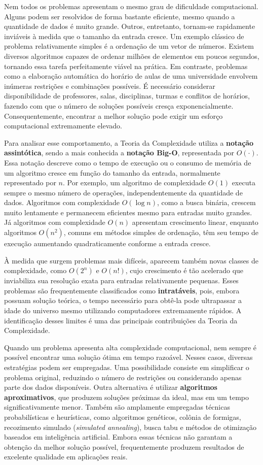 \documentclass[
  brazilian,
  letterpaper,
]{book}
\theoremstyle{plain}
\theoremstyle{definition}
\theoremstyle{remark}
\begin{document}
Nem todos os problemas apresentam o mesmo grau de dificuldade
computacional. Alguns podem ser resolvidos de forma bastante eficiente,
mesmo quando a quantidade de dados é muito grande. Outros, entretanto,
tornam-se rapidamente inviáveis à medida que o tamanho da entrada
cresce. Um exemplo clássico de problema relativamente simples é a
ordenação de um vetor de números. Existem diversos algoritmos capazes de
ordenar milhões de elementos em poucos segundos, tornando essa tarefa
perfeitamente viável na prática. Em contraste, problemas como a
elaboração automática do horário de aulas de uma universidade envolvem
inúmeras restrições e combinações possíveis. É necessário considerar
disponibilidade de professores, salas, disciplinas, turmas e conflitos
de horários, fazendo com que o número de soluções possíveis cresça
exponencialmente. Consequentemente, encontrar a melhor solução pode
exigir um esforço computacional extremamente elevado.

Para analisar esse comportamento, a Teoria da Complexidade utiliza a
\textbf{notação assintótica}, sendo a mais conhecida a \textbf{notação
Big-O}, representada por \(O(\cdot)\). Essa notação descreve como o
tempo de execução ou o consumo de memória de um algoritmo cresce em
função do tamanho da entrada, normalmente representado por \(n\). Por
exemplo, um algoritmo de complexidade \(O(1)\) executa sempre o mesmo
número de operações, independentemente da quantidade de dados.
Algoritmos com complexidade \(O(\log n)\), como a busca binária, crescem
muito lentamente e permanecem eficientes mesmo para entradas muito
grandes. Já algoritmos com complexidade \(O(n)\) apresentam crescimento
linear, enquanto algoritmos \(O(n^2)\), comuns em métodos simples de
ordenação, têm seu tempo de execução aumentando quadraticamente conforme
a entrada cresce.

À medida que surgem problemas mais difíceis, aparecem também novas
classes de complexidade, como \(O(2^n)\) e \(O(n!)\), cujo crescimento é
tão acelerado que inviabiliza sua resolução exata para entradas
relativamente pequenas. Esses problemas são frequentemente classificados
como \textbf{intratáveis}, pois, embora possuam solução teórica, o tempo
necessário para obtê-la pode ultrapassar a idade do universo mesmo
utilizando computadores extremamente rápidos. A identificação desses
limites é uma das principais contribuições da Teoria da Complexidade.

Quando um problema apresenta alta complexidade computacional, nem sempre
é possível encontrar uma solução ótima em tempo razoável. Nesses casos,
diversas estratégias podem ser empregadas. Uma possibilidade consiste em
simplificar o problema original, reduzindo o número de restrições ou
considerando apenas parte dos dados disponíveis. Outra alternativa é
utilizar \textbf{algoritmos aproximativos}, que produzem soluções
próximas da ideal, mas em um tempo significativamente menor. Também são
amplamente empregadas técnicas probabilísticas e heurísticas, como
algoritmos genéticos, colônia de formigas, recozimento simulado
(\emph{simulated annealing}), busca tabu e métodos de otimização
baseados em inteligência artificial. Embora essas técnicas não garantam
a obtenção da melhor solução possível, frequentemente produzem
resultados de excelente qualidade em aplicações reais.
\end{document}
